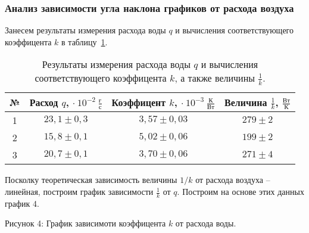 \documentclass[a4paper,11pt]{article}
\begin{document}
\subsubsection{Анализ зависимости угла наклона графиков от расхода воздуха}
Занесем результаты измерения расхода воды $q$ и вычисления соответствующего коэффицента $k$ в таблицу~\ref{table:tab7}.
\begin{table}[h!]
\centering
\begin{tabular}{ ||c|c|c|c|| }
  \hline
  № & Расход $q$, $\cdot\ 10^{-2}\ \frac{г}{с}$ & Коэффицент $k$, $\cdot\ 10^{-3}\ \frac{К}{Вт}$ & Величина $\frac{1}{k}$, $\frac{Вт}{К}$ \\
  \hline
  1 & $23,1 \pm 0,3$ & $3,57 \pm 0,03$ & $279 \pm 2$ \\
  2 & $15,8 \pm 0,1$ & $5,02 \pm 0,06$ & $199 \pm 2$ \\
  3 & $20,7 \pm 0,1$ & $3,70 \pm 0,06$ & $271 \pm 4$ \\
  \hline
\end{tabular}
\caption{Результаты измерения расхода воды $q$ и вычисления соответствующего коэффицента $k$, а также величины $\frac{1}{k}$.}
\label{table:tab7}
\end{table}
\newline
Посколку теоретическая зависимость величины $1/k$ от расхода воздуха -- линейная, построим график зависимости $\frac{1}{k}$ от $q$.\newline
Построим на основе этих данных график 4.\newline\newline
\begin{center}
\newline
Рисунок 4: График зависимоти коэффицента $k$ от расхода воды.\newline
\end{center}
\end{document}
